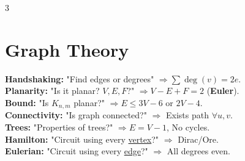 \documentclass[10pt]{article}
\begin{document}
\begin{multicols}{3}
\section{Graph Theory}
\textbf{Handshaking:} "Find edges or degrees" $\Rightarrow \sum \deg(v) = 2e$. \\
\textbf{Planarity:} "Is it planar? $V, E, F$?" $\Rightarrow V-E+F=2$ (\textbf{Euler}). \\
\textbf{Bound:} "Is $K_{n,m}$ planar?" $\Rightarrow E \le 3V-6$ or $2V-4$. \\
\textbf{Connectivity:} "Is graph connected?" $\Rightarrow$ Exists path $\forall u,v$. \\
\textbf{Trees:} "Properties of trees?" $\Rightarrow E=V-1$, No cycles. \\
\textbf{Hamilton:} "Circuit using every \underline{vertex}?" $\Rightarrow$ Dirac/Ore. \\
\textbf{Eulerian:} "Circuit using every \underline{edge}?" $\Rightarrow$ All degrees even.

\end{multicols}
\end{document}
